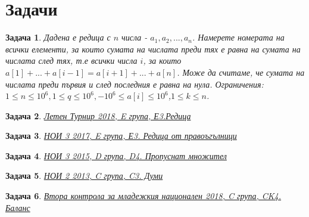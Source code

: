 \documentclass[]{article}
\newtheorem{problem}{Задача}
\begin{document}
\section{Задачи}

\begin{problem}
Дадена е редица с $n$ числа - $a_1,a_2,...,a_n$. Намерете номерата на всички елементи, за които сумата на числата преди тях е равна на сумата на числата след тях, т.е всички числа $i$, за които $a[1]+...+a[i-1]=a[i+1]+...+a[n]$. Може да считаме, че сумата на числата преди първия и след последния е равна на нула.\newline
Ограничения: $1\leq n\leq 10^6,1\leq q\leq 10^6,-10^6 \leq a[i]\leq 10^6$,$1\leq k\leq n$.
\end{problem}

\begin{problem}
\href{https://arena.olimpiici.com/#/catalog/87/problem/198}{Летен Турнир 2018, E група, Е3.Редица}
\end{problem}

\begin{problem}
\href{https://arena.olimpiici.com/#/catalog/251/problem/709}{НОИ 3 2017, E група, Е3. Редица от правоъгълници}
\end{problem}

\begin{problem}
\href{https://arena.olimpiici.com/#/catalog/241/problem/662}{НОИ 3 2015, D група, D4. Пропуснат множител}
\end{problem}

\begin{problem}
\href{https://arena.olimpiici.com/#/catalog/175/problem/417}{НОИ 2 2013, C група, C3. Думи}
\end{problem}

\begin{problem}
\href{https://arena.olimpiici.com/api/public/problems/1142/pdf}{Втора контрола за младежкия национален 2018, C група, CK4. Баланс}
\end{problem}
\end{document}

